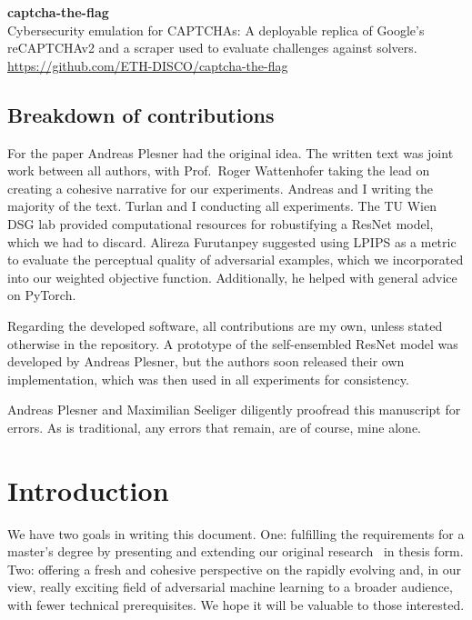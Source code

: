 \documentclass[a4paper, oneside]{discothesis}
\newcommand{\linebreaks}{\vspace*{0.5em}}
\begin{document}
\linebreaks

\begin{samepage}
	\begin{spacing}{1}
		\textbf{captcha-the-flag} \\
		Cybersecurity emulation for CAPTCHAs: A deployable replica of Google's reCAPTCHAv2 and a scraper used to evaluate challenges against solvers. \\
		\url{https://github.com/ETH-DISCO/captcha-the-flag}
	\end{spacing}
\end{samepage}

\section*{Breakdown of contributions}

For the paper Andreas Plesner had the original idea. The written text was joint work between all authors, with Prof.\ Roger Wattenhofer taking the lead on creating a cohesive narrative for our experiments. Andreas and I writing the majority of the text. Turlan and I conducting all experiments. The TU Wien DSG lab provided computational resources for robustifying a ResNet model, which we had to discard. Alireza Furutanpey suggested using LPIPS as a metric to evaluate the perceptual quality of adversarial examples, which we incorporated into our weighted objective function. Additionally, he helped with general advice on PyTorch.

Regarding the developed software, all contributions are my own, unless stated otherwise in the repository. A prototype of the self-ensembled ResNet model was developed by Andreas Plesner, but the authors soon released their own implementation, which was then used in all experiments for consistency.

Andreas Plesner and Maximilian Seeliger diligently proofread this manuscript for errors. As is traditional, any errors that remain, are of course, mine alone.

\tableofcontents

\mainmatter

\chapter{Introduction}

We have two goals in writing this document. One: fulfilling the requirements for a master's degree by presenting and extending our original research~\cite{jabary2024seeing} in thesis form. Two: offering a fresh and cohesive perspective on the rapidly evolving and, in our view, really exciting field of adversarial machine learning to a broader audience, with fewer technical prerequisites. We hope it will be valuable to those interested.
\end{document}
